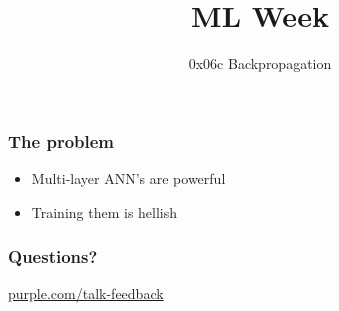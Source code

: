 
\title
{ML Week}
\subtitle{0x06c \hspace{2mm}  Backpropagation}




\begin{frame}
  \titlepage
\end{frame}


\begin{frame}
\end{frame}

\begin{frame}
  \frametitle{The problem}
  \begin{itemize}
  \item Multi-layer ANN's are powerful
  \item Training them is hellish
  \end{itemize}
\end{frame}

\begin{frame}
\end{frame}

\begin{frame}
\end{frame}


\begin{frame}
  \frametitle{Questions?}
  \centerline{\large\url{purple.com/talk-feedback}}
\end{frame}


